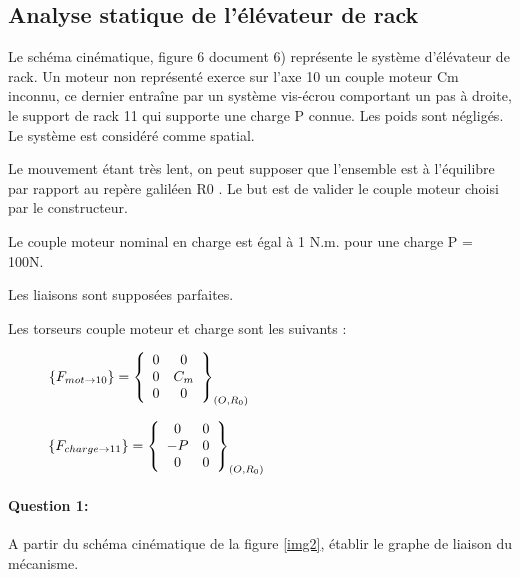 \subsection{Analyse statique de l'élévateur de rack}

Le schéma cinématique, figure 6 document 6) représente le système d'élévateur de rack. Un moteur non représenté exerce sur l'axe 10 un couple moteur Cm inconnu, ce dernier entraîne par un système vis-écrou comportant un pas à droite, le support de rack 11 qui supporte une charge P connue. Les poids sont négligés. Le système est considéré comme spatial.

Le mouvement étant très lent, on peut supposer que l'ensemble est à l'équilibre par rapport au repère galiléen R0 . Le but est de valider le couple moteur choisi par le constructeur.

Le couple moteur nominal en charge est égal à 1 N.m. pour une charge P = 100N.

Les liaisons sont supposées parfaites.

Les torseurs couple moteur et charge sont les suivants :

\begin{figure}[!h]
  \begin{minipage}{0.35\linewidth}
  \begin{math}
  \left\{F_{mot \rightarrow 10}\right\}=\left\{
  \begin{array}{c c}
  0 & 0 \\
  0 & C_m \\
  0 & 0
  \end{array}\right\}_{(O,R_0)}
  \end{math}
  \end{minipage}
  \hfill
  \begin{minipage}{0.60\linewidth}
  \begin{math}
  \left\{F_{charge \rightarrow 11}\right\}=\left\{
  \begin{array}{c c}
  0 & 0 \\
  -P & 0 \\
  0 & 0
  \end{array}\right\}_{(O,R_0)}
  \end{math}
\end{minipage}
\end{figure}

\paragraph{Question 1:} A partir du schéma cinématique de la figure \ref{img2}, établir le graphe de liaison du mécanisme.

